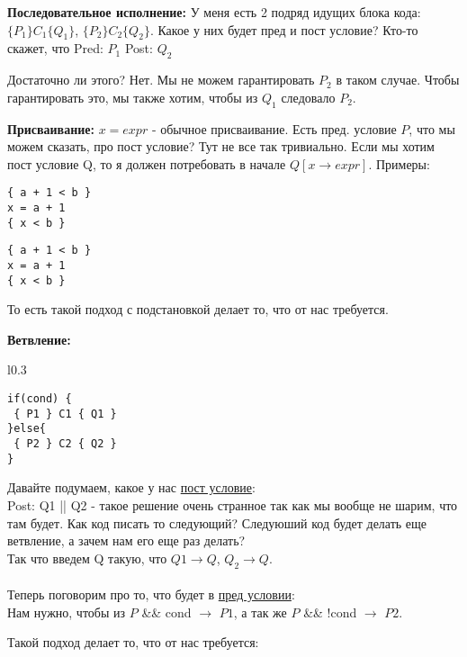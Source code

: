 \textbf{Последовательное исполнение:} У меня есть 2 подряд идущих блока кода: $\{ P_1 \} C_1 \{ Q_1\}$, $\{ P_2 \} C_2 \{ Q_2\}$. Какое у них будет пред и пост условие? Кто-то скажет, что
Pred: $P_1$ 
Post: $Q_2$

Достаточно ли этого? Нет. Мы не можем гарантировать $P_2$ в таком случае. Чтобы гарантировать это, мы  также хотим, чтобы из $Q_1$ следовало $P_2$.

\textbf{Присваивание:} $x = expr$ - обычное присваивание. Есть пред. условие $P$, что мы можем сказать, про пост условие? Тут не все так тривиально. Если мы хотим пост условие Q, то я должен потребовать в начале $Q[x \rightarrow expr]$. Примеры:


\begin{minipage}[h]{0.3\linewidth}
\begin{verbatim}
{ a + 1 < b }
x = a + 1
{ x < b }
\end{verbatim}
\end{minipage}
\hfill 
\begin{minipage}[h]{0.6\linewidth}
\begin{verbatim}
{ a + 1 < b }
x = a + 1
{ x < b }
\end{verbatim}
\end{minipage}

То есть такой подход с подстановкой делает то, что от нас требуется.

\textbf{Ветвление:}

\begin{wrapfigure}{l}{0.3\linewidth} 
   \begin{verbatim}
if(cond) {
 { P1 } C1 { Q1 }
}else{
 { P2 } C2 { Q2 }
}
\end{verbatim}
\end{wrapfigure}

Давайте подумаем, какое у нас  \uline{пост условие}:\\  Post: Q1 || Q2 - такое решение очень странное так как мы вообще не шарим, что там будет. Как код писать то следующий? Следуюший код будет делать еще ветвление, а зачем нам его еще раз делать?  \\Так что введем Q такую, что $Q1 \rightarrow Q$, $Q_2 \rightarrow Q$. \\ \\ Теперь поговорим про то, что будет в \uline{пред условии}:\\ Нам нужно, чтобы из $P$ \&\&  cond $\rightarrow$ $P1$, а так же $P$ \&\& !cond $\rightarrow$ $P2$.

Такой подход делает то, что от нас требуется:

